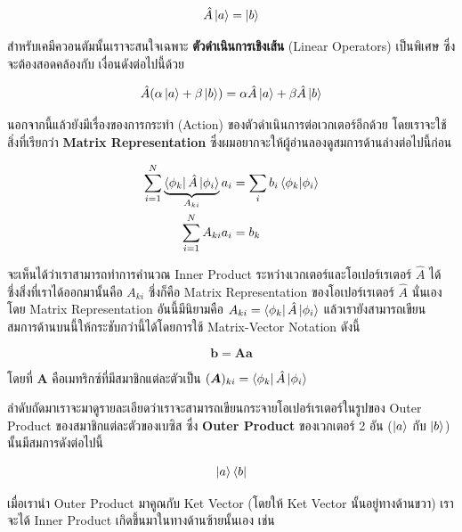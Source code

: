 \begin{equation}
    \label{eq:operator}
    \hat{A} \ket{a}
    =
    \ket{b}
\end{equation}

\noindent สำหรับเคมีควอนตัมนั้นเราจะสนใจเฉพาะ \textbf{ตัวดำเนินการเชิงเส้น} (Linear Operators) เป็นพิเศษ ซึ่งจะต้องสอดคล้องกับ%
เงื่อนดังต่อไปนี้ด้วย

\begin{equation}
    \hat{A} (\alpha \ket{a} + \beta \ket{b})
    =
    \alpha \hat{A} \ket{a} + \beta \hat{A} \ket{b}
\end{equation}

นอกจากนี้แล้วยังมีเรื่องของการกระทำ (Action) ของตัวดำเนินการต่อเวกเตอร์อีกด้วย โดยเราจะใช้สิ่งที่เรียกว่า \textbf{Matrix Representation}
ซึ่งผมอยากจะให้ผู้อ่านลองดูสมการด้านล่างต่อไปนี้ก่อน


\begin{equation}
    \begin{split}
        \sum_{i = 1}^N \underbrace{\bra{\phi_k}\hat{A} \ket{\phi_i}}_{A_{ki} } a_i
        &=
        \sum_i b_i \braket{\phi_k}{\phi_i} \\
        \sum_{i = 1}^N A_{ki} a_i
        &=
        b_k
    \end{split}
\end{equation}

\noindent จะเห็นได้ว่าเราสามารถทำการคำนวณ Inner Product ระหว่างเวกเตอร์และโอเปอร์เรเตอร์ $\hat{A}$ ได้ ซึ่งสิ่งที่เราได้ออกมานั้นคือ
$A_{ki}$ ซึ่งก็คือ Matrix Representation ของโอเปอร์เรเตอร์ $\hat{A}$ นั่นเอง โดย Matrix Representation อันนี้มีนิยามคือ
$A_{ki} = \bra{\phi_k}\hat{A} \ket{\phi_i}$ แล้วเรายังสามารถเขียนสมการด้านบนนี้ให้กระชับกว่านี้ได้โดยการใช้ Matrix-Vector
Notation ดังนี้

\begin{equation}
    \bm{b}
    =
    \bm{A} \bm{a}
\end{equation}

\noindent โดยที่ $\bm{A}$ คือเมทริกซ์ที่มีสมาชิกแต่ละตัวเป็น $(\bm{A})_{ki} = \bra{\phi_k}\hat{A} \ket{\phi_i}$

ลำดับถัดมาเราจะมาดูรายละเอียดว่าเราจะสามารถเขียนกระจายโอเปอร์เรเตอร์ในรูปของ Outer Product ของสมาชิกแต่ละตัวของเบซิส ซึ่ง
\textbf{Outer Product} ของเวกเตอร์ 2 อัน ($\ket{a}$ กับ $\ket{b}$) นั้นมีสมการดังต่อไปนี้

\begin{equation}
    \ket{a}\bra{b}
\end{equation}

\noindent เมื่อเรานำ Outer Product มาคูณกับ Ket Vector (โดยให้ Ket Vector นั้นอยู่ทางด้านขวา) เราจะได้ Inner Product
เกิดขึ้นมาในทางด้านซ้ายนั้นเอง เช่น

